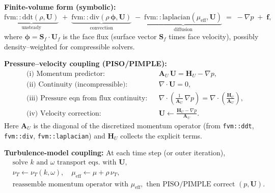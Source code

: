 \medskip
\noindent\textbf{Finite-volume form (symbolic):}
\begin{equation}
\underbrace{\mathrm{fvm::ddt}(\rho,\mathbf{U})}_{\text{unsteady}}
\;+\;
\underbrace{\mathrm{fvm::div}(\rho\,\boldsymbol{\phi},\mathbf{U})}_{\text{convection}}
\;-\;
\underbrace{\mathrm{fvm::laplacian}(\mu_{\mathrm{eff}},\mathbf{U})}_{\text{diffusion}}
\;=\;
-\nabla p \;+\; \mathbf{f},
\end{equation}
where $\boldsymbol{\phi}=\mathbf{S}_f\cdot\mathbf{U}_f$ is the face flux (surface vector $\mathbf{S}_f$ times face velocity), possibly density–weighted for compressible solvers.

\medskip
\noindent\textbf{Pressure–velocity coupling (PISO/PIMPLE):}
\begin{align}
&\text{(i) Momentum predictor:} && \mathbf{A}_U\,\mathbf{U} = \mathbf{H}_U - \nabla p, \\
&\text{(ii) Continuity (incompressible):} && \nabla\!\cdot\!\mathbf{U}=0, \\
&\text{(iii) Pressure eqn from flux continuity:} &&
\nabla\!\cdot\!\left(\frac{1}{\mathbf{A}_U}\,\nabla p\right) = \nabla\!\cdot\!\left(\frac{\mathbf{H}_U}{\mathbf{A}_U}\right), \\
&\text{(iv) Velocity correction:} &&
\mathbf{U} \leftarrow \frac{\mathbf{H}_U - \nabla p}{\mathbf{A}_U}.
\end{align}
Here $\mathbf{A}_U$ is the diagonal of the discretized momentum operator (from \texttt{fvm::ddt}, \texttt{fvm::div}, \texttt{fvm::laplacian}) and $\mathbf{H}_U$ collects the explicit terms.

\medskip
\noindent\textbf{Turbulence-model coupling:} At each time step (or outer iteration),
\begin{align}
&\text{solve } k \text{ and } \omega \text{ transport eqs. with } \mathbf{U}, \\
&\nu_T \leftarrow \nu_T(k,\omega), \quad \mu_{\mathrm{eff}} \leftarrow \mu + \rho\,\nu_T, \\
&\text{reassemble momentum operator with } \mu_{\mathrm{eff}}, \text{ then PISO/PIMPLE correct } (p,\mathbf{U}).
\end{align}

